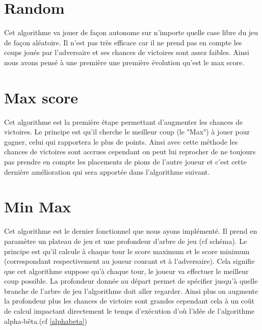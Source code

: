 \documentclass{report}
\begin{document}
		\section{Random}
		Cet algorithme va jouer de façon autonome sur n'importe quelle case libre du jeu de façon aléatoire. Il n'est pas très efficace car il ne prend pas en compte les coups joués par l'adversaire et ses chances de victoires sont assez faibles. Ainsi nous avons pensé à une première une première évolution qu'est le max score.
		\section{Max score}
		Cet algorithme est la première étape permettant d'augmenter les chances de victoires. Le principe est qu'il cherche le meilleur coup (le "Max") à jouer pour gagner, celui qui rapportera le plus de points. Ainsi avec cette méthode les chances de victoires sont accrues cependant on peut lui reprocher de ne toujours pas prendre en compte les placements de pions de l'autre joueur et c'est cette dernière amélioration qui sera apportée dans l'algorithme suivant. 
		\section{Min Max}
        Cet algorithme est le dernier fonctionnel que nous ayons implémenté. Il prend en paramètre un plateau de jeu et une profondeur d'arbre de jeu (cf schéma). Le principe est qu'il calcule à chaque tour le score maximum et le score minimum (correspondant respectivement au joueur courant et à l'adversaire). Cela signifie que cet algorithme suppose qu'à chaque tour, le joueur va effectuer le meilleur coup possible. La profondeur donnée au départ permet de spécifier jusqu'à quelle branche de l'arbre de jeu l'algorithme doit aller regarder. Ainsi plus on augmente la profondeur plus les chances de victoire sont grandes cependant cela à un coût de calcul impactant directement le temps d'exécution d'où l'idée de l'algorithme alpha-bêta.(cf \ref{alphabeta})
\end{document}
